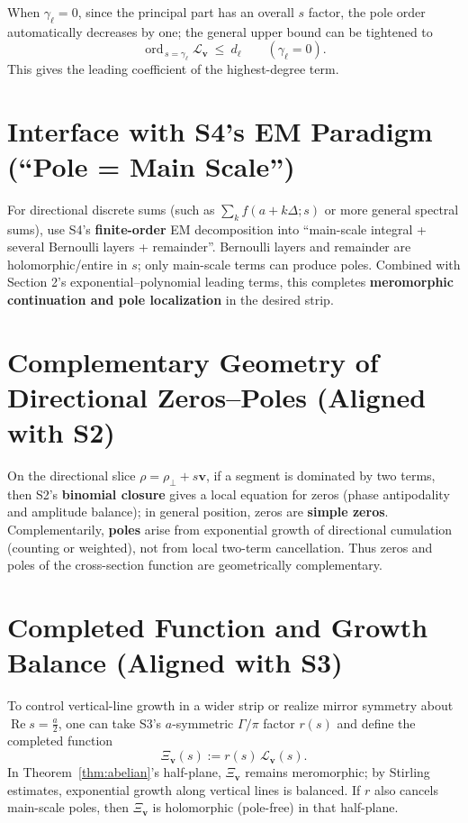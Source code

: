 \documentclass[11pt,a4paper]{article}
\theoremstyle{remark}
\DeclareMathOperator{\Re}{Re}
\DeclareMathOperator{\ord}{ord}
\begin{document}
When $\gamma_\ell=0$, since the principal part has an overall $s$ factor, the pole order automatically decreases by one; the general upper bound can be tightened to
\begin{equation}
\ord_{\,s=\gamma_\ell}\mathcal{L}_{\mathbf{v}}\ \le\ d_\ell\qquad(\gamma_\ell=0).
\end{equation}
This gives the leading coefficient of the highest-degree term.

\section{Interface with S4's EM Paradigm (``Pole = Main Scale'')}

For directional discrete sums (such as $\sum_k f(a+k\Delta;s)$ or more general spectral sums), use S4's \textbf{finite-order} EM decomposition into ``main-scale integral + several Bernoulli layers + remainder''. Bernoulli layers and remainder are holomorphic/entire in $s$; only main-scale terms can produce poles. Combined with Section 2's exponential--polynomial leading terms, this completes \textbf{meromorphic continuation and pole localization} in the desired strip.

\section{Complementary Geometry of Directional Zeros--Poles (Aligned with S2)}

On the directional slice $\rho=\rho_\perp+s\mathbf{v}$, if a segment is dominated by two terms, then S2's \textbf{binomial closure} gives a local equation for zeros (phase antipodality and amplitude balance); in general position, zeros are \textbf{simple zeros}. Complementarily, \textbf{poles} arise from exponential growth of directional cumulation (counting or weighted), not from local two-term cancellation. Thus zeros and poles of the cross-section function are geometrically complementary.

\section{Completed Function and Growth Balance (Aligned with S3)}

To control vertical-line growth in a wider strip or realize mirror symmetry about $\Re s=\frac{a}{2}$, one can take S3's $a$-symmetric $\Gamma/\pi$ factor $r(s)$ and define the completed function
\begin{equation}
\Xi_{\mathbf{v}}(s):=r(s)\,\mathcal{L}_{\mathbf{v}}(s).
\end{equation}
In Theorem~\ref{thm:abelian}'s half-plane, $\Xi_{\mathbf{v}}$ remains meromorphic; by Stirling estimates, exponential growth along vertical lines is balanced. If $r$ also cancels main-scale poles, then $\Xi_{\mathbf{v}}$ is holomorphic (pole-free) in that half-plane.
\end{document}
